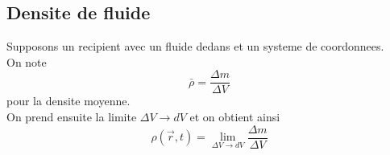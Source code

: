 \documentclass[../main.tex]{subfiles}
\begin{document}
\subsection{Densite de fluide}
Supposons un recipient avec un fluide dedans et un systeme de coordonnees.\\
On note
\[ 
	\bar{\rho} = \frac{\Delta m}{\Delta V}
\]
pour la densite moyenne.\\
On prend ensuite la limite $\Delta V \to dV$ et on obtient ainsi 
\[ 
	\rho( \vec{r},t) = \lim_{\Delta V \to dV} \frac{\Delta m}{\Delta V}
\]
\end{document}
